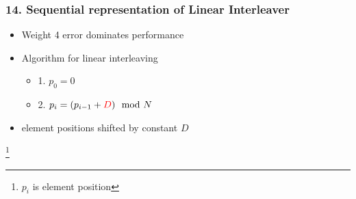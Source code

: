 \documentclass{beamer}  %
\newcommand\blfootnote[1]{%
  \begingroup
  \renewcommand\thefootnote{}\footnote{#1}%
  \addtocounter{footnote}{-1}%
  \endgroup
}
\begin{document}
\begin{frame}
\frametitle{14. Sequential representation of Linear Interleaver}

\begin{itemize}
\setlength\itemsep{2em}

\item Weight 4 error dominates performance

 \item Algorithm for linear interleaving



\begin{itemize}
\setlength\itemsep{1.5em}
\item 1. $p_0=0$
 
\item 2. $p_i=(p_{i-1}+\textcolor{red}{D}) \mod N$

\end{itemize}



\item element positions shifted  by constant $D$
\end{itemize}

\blfootnote{$p_i$ is element position}
\end{frame}
\end{document}
